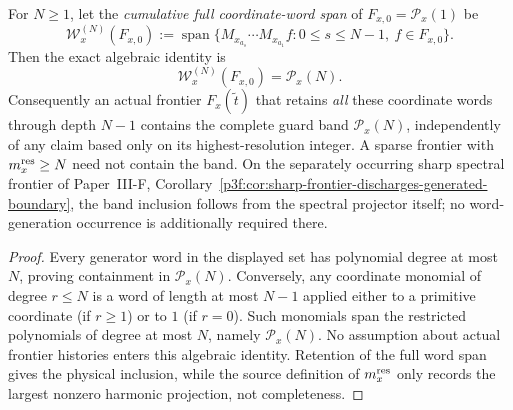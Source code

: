 \documentclass[12pt,a4paper]{article}
\begin{document}
\begin{corollary}
\label{p2c:cor:v268-primitive-word-guard}
For $N\ge1$, let the \emph{cumulative full coordinate-word span} of
$F_{x,0}=\mathcal P_x(1)$ be
\[
 \mathcal W_x^{(N)}(F_{x,0})
 :=\operatorname{span}\{M_{x_{a_s}}\cdots M_{x_{a_1}}f:
 0\le s\le N-1,\ f\in F_{x,0}\}.
\]
Then the exact algebraic identity is
\[
 \boxed{\mathcal W_x^{(N)}(F_{x,0})=\mathcal P_x(N).}
\]
Consequently an actual frontier $F_x(\widetilde t)$ that retains
\emph{all} these coordinate words through depth $N-1$ contains the
complete guard band $\mathcal P_x(N)$, independently of any claim
based only on its highest-resolution integer.
A sparse frontier with $m_x^{\rm res}\ge N$ need not contain the band.
On the separately occurring sharp spectral frontier of
Paper~III-F, Corollary~\ref{p3f:cor:sharp-frontier-discharges-generated-boundary},
the band inclusion follows from the spectral projector itself;
no word-generation occurrence is additionally required there.
\end{corollary}
\begin{proof}
Every generator word in the displayed set has polynomial degree at
most $N$, proving containment in $\mathcal P_x(N)$.  Conversely,
any coordinate monomial of degree $r\le N$ is a word of length at
most $N-1$ applied either to a primitive coordinate (if $r\ge1$)
or to $1$ (if $r=0$).  Such monomials span the restricted
polynomials of degree at most $N$, namely $\mathcal P_x(N)$.
No assumption about actual frontier histories enters this algebraic
identity.  Retention of the full word span gives the physical
inclusion, while the source definition of $m_x^{\rm res}$ only
records the largest nonzero harmonic projection, not completeness.
\end{proof}
\end{document}
